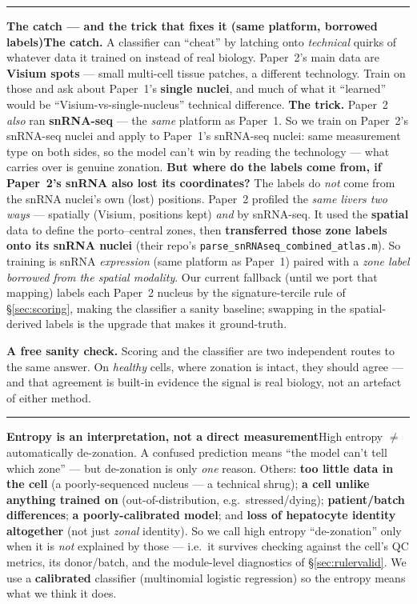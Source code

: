 \documentclass[11pt]{article}
\newcommand{\aside}[2]{\par\medskip\noindent\textcolor{teal0}{\rule{2pt}{\baselineskip}}\quad\textbf{\textcolor{teal0}{#1}}\quad #2\par\medskip}
\newcommand{\code}[1]{\texttt{#1}}
\begin{document}
\aside{The catch --- and the trick that fixes it (same platform, borrowed labels)}{\textbf{The catch.}
A classifier can ``cheat'' by latching onto \emph{technical} quirks of whatever data it trained on
instead of real biology. Paper~2's main data are \textbf{Visium spots} --- small multi-cell tissue
patches, a different technology. Train on those and ask about Paper~1's \textbf{single nuclei}, and much
of what it ``learned'' would be ``Visium-vs-single-nucleus'' technical difference.
\textbf{The trick.} Paper~2 \emph{also} ran \textbf{snRNA-seq} --- the \emph{same} platform as Paper~1.
So we train on Paper~2's snRNA-seq nuclei and apply to Paper~1's snRNA-seq nuclei: same measurement type
on both sides, so the model can't win by reading the technology --- what carries over is genuine
zonation. \textbf{But where do the labels come from, if Paper~2's snRNA also lost its coordinates?} The
labels do \emph{not} come from the snRNA nuclei's own (lost) positions. Paper~2 profiled the \emph{same
livers two ways} --- spatially (Visium, positions kept) \emph{and} by snRNA-seq. It used the
\textbf{spatial} data to define the porto--central zones, then \textbf{transferred those zone labels
onto its snRNA nuclei} (their repo's \code{parse\_snRNAseq\_combined\_atlas.m}). So training is snRNA
\emph{expression} (same platform as Paper~1) paired with a \emph{zone label borrowed from the spatial
modality}. Our current fallback (until we port that mapping) labels each Paper~2 nucleus by the
signature-tercile rule of \S\ref{sec:scoring}, making the classifier a sanity baseline; swapping in the
spatial-derived labels is the upgrade that makes it ground-truth.}

\textbf{A free sanity check.} Scoring and the classifier are two independent routes to the same answer.
On \emph{healthy} cells, where zonation is intact, they should agree --- and that agreement is built-in
evidence the signal is real biology, not an artefact of either method.

\aside{Entropy is an interpretation, not a direct measurement}{High entropy $\neq$ automatically
de-zonation. A confused prediction means ``the model can't tell which zone'' --- but de-zonation is only
\emph{one} reason. Others: \textbf{too little data in the cell} (a poorly-sequenced nucleus --- a
technical shrug); \textbf{a cell unlike anything trained on} (out-of-distribution, e.g.\ stressed/dying);
\textbf{patient/batch differences}; \textbf{a poorly-calibrated model}; and \textbf{loss of hepatocyte
identity altogether} (not just \emph{zonal} identity). So we call high entropy ``de-zonation'' only when
it is \emph{not} explained by those --- i.e.\ it survives checking against the cell's QC metrics, its
donor/batch, and the module-level diagnostics of \S\ref{sec:rulervalid}. We use a \textbf{calibrated}
classifier (multinomial logistic regression) so the entropy means what we think it does.}
\end{document}
